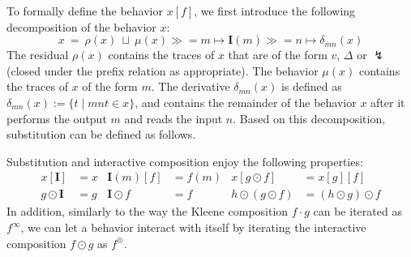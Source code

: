 \documentclass[acmsmall,timestamp,review,anonymous]{acmart}
\newcommand{\kw}[1]{\ensuremath{ \mathsf{#1} }}
\newcommand{\bind}{\gg\!\!=}
\begin{document}
%
%

To formally define the behavior $x[f]$,
we first introduce the following decomposition
of the behavior $x$:
\[
    x \: = \: \rho(x) \: \sqcup \:
        \mu(x) \bind m \mapsto \mathbf{I}(m) \bind n \mapsto \delta_{mn}(x)
\]
The residual $\rho(x)$
contains the traces of $x$ that are of the form $v$, $\Delta$ or $\lightning$
(closed under the prefix relation as appropriate).
The behavior $\mu(x)$ contains the traces of $x$ of the form $m$.
The derivative $\delta_{mn}(x)$ is defined as
$\delta_{mn}(x) := \{ t \mid mnt \in x \}$,
and contains the remainder of the behavior $x$
after it performs the output $m$ and reads the input $n$.
Based on this decomposition,
substitution can be defined as follows.

\begin{definition}[Substitution]

\end{definition}

Substitution and interactive composition
enjoy the following properties:
\begin{align*}
  x[\mathbf{I}] &= x &
  \mathbf{I}(m)[f] &= f(m) &
  x[g \odot f] &= x[g][f] \\
  g \odot \mathbf{I} &= g &
  \mathbf{I} \odot f &= f &
  h \odot (g \odot f) &= (h \odot g) \odot f
\end{align*}
In addition,
similarly to the way
the Kleene composition $f \cdot g$ can be iterated as $f^\infty$,
we can let a behavior interact with itself
by iterating the interactive composition $f \odot g$ as $f^\circledcirc$.
\end{document}
